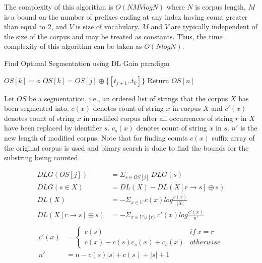 \documentclass[runningheads]{llncs}
\begin{document}
The complexity of this algorithm is $O(NMVlogN)$ where $N$ is corpus length, $M$ is a bound on the number of prefixes ending at any index having count greater than equal to 2, and $V$ is size of vocabulary. $M$ and $V$ are typically independent of the size of the corpus and may be treated as constants. Thus, the time complexity of this algorithm can be taken as $O(NlogN)$. 

\begin{algorithm}
	\caption{Find Optimal Segmentation using DL Gain paradigm}
	\label{dl_gain}
	\begin{algorithmic}[1]
		    \State $OS[k] = \phi$
                  \EndIf 
                    \State $OS[k] = OS[j] \oplus \{[t_{j+1}..t_k]\}$
                \EndIf
            \EndFor
        \EndFor
		\State Return $OS[n]$
		\EndProcedure
	\end{algorithmic}
\end{algorithm}

Let $OS$ be a segmentation, i.e., an ordered list of strings that the corpus $X$ has been segmented into. $c(x)$ denotes count of string $x$ in corpus $X$ and $c'(x)$ denotes count of string $x$ in modified corpus after all occurrences of string $r$ in $X$ have been replaced by identifier $s$. $c_s(x)$ denotes count of string $x$ in $s$. $n'$ is the new length of modified corpus. Note that for finding counts $c(x)$ suffix array of the original corpus is used and binary search is done to find the bounds for the substring being counted.
 
\begin{align*}
    DLG(OS[j]) &= \Sigma_{s \in OS[j]}\ DLG(s)  \\
    DLG(s \in X) &= DL(X) - DL(X[r \rightarrow s]\oplus s) \\
    DL(X) &= -\Sigma_{x \in V}\ c(x) log \frac{c(x)}{|X|} \\
    DL(X[r \rightarrow s]\oplus s) &= -\Sigma_{x \in V \cup \{r\}}\ c'(x) log \frac{c'(x)}{n'} \\
\end{align*}
\begin{align*}
    c'(x) &= \left\{
    \begin{array}{ll}
        c(s) & if\ x = r  \\
        c(x)-c(s)c_s(x)+c_s(x)  & otherwise
    \end{array} 
    \right.\\
    n' &= n - c(s)|s| + c(s) + |s| + 1\\
\end{align*}
\end{document}
